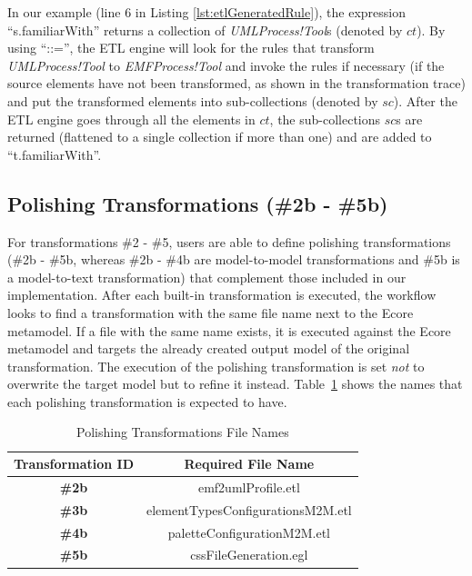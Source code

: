 In our example (line 6 in Listing \ref{lst:etlGeneratedRule}), the expression ``s.familiarWith'' returns a collection of \emph{UMLProcess!Tool}s (denoted by $ct$). By using ``::='', the ETL engine will look for the rules that transform \emph{UMLProcess!Tool} to \emph{EMFProcess!Tool} and invoke the rules if 
necessary (if the source elements have not been transformed, as shown in the transformation trace) and put the transformed elements into sub-collections 
(denoted by $sc$). 
After the ETL engine goes through all the elements in $ct$, the sub-collections $sc$s are returned (flattened to a single collection if more than one) and are added to ``t.familiarWith''.


\vspace{5mm}
\subsection{Polishing Transformations (\#2b - \#5b)} 
\label{sec:transformationPatches}

For transformations \#2 - \#5, users are able to define polishing transformations (\#2b - \#5b, whereas \#2b - \#4b are model-to-model transformations and \#5b is a model-to-text transformation) that complement those included in our implementation. 
After each built-in transformation is executed, the workflow looks to find a transformation with the same file name next to the Ecore metamodel. 
If a file with the same name exists, it is executed against the Ecore metamodel and targets the already created output model of the original transformation. 
The execution of the polishing transformation is set \textit{not} to overwrite the target model but to refine it instead.
Table~\ref{tab:polishingTransformationsNames} shows the names that each polishing transformation is expected to have.

\begin{table}[ht!]
	\centering
	\begin{tabular}{|c|c|}
		\cline{1-2}
		\textbf{Transformation ID}  & \textbf{Required File Name}\\ \hline
		\textbf{\#2b} & emf2umlProfile.etl\\ \hline
		\textbf{\#3b} & elementTypesConfigurationsM2M.etl\\ \hline
		\textbf{\#4b} & paletteConfigurationM2M.etl\\ \hline
		\textbf{\#5b} & cssFileGeneration.egl\\ \hline
		\cline{1-2}
	\end{tabular}
	\caption{Polishing Transformations File Names}
	\label{tab:polishingTransformationsNames}
\end{table}



